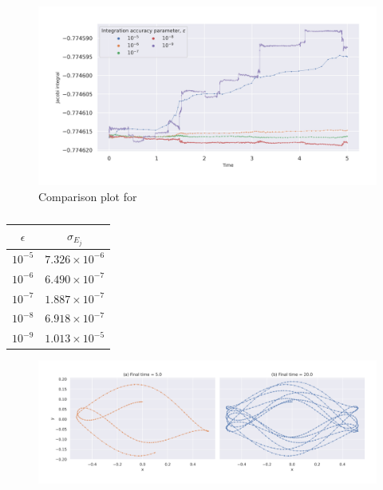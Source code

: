 \documentclass[a4paper]{article}
\begin{document}
		\begin{figure} [h]
			\includegraphics[width=\columnwidth]{../task1/q3-epsilon/plots/q3.jpg}
			\caption{Comparison plot for}
			\label{fig:task1.3}
		\end{figure}
		
		\begin{table} [h]
			\centering
			\setlength{\tabcolsep}{20pt} 
			\begin{tabular} {c c}
				\toprule
				\textbf{\(\epsilon\)} & \textbf{\(\sigma_{E_j}\)} \\
				\midrule
				\addlinespace
				\(10^{-5}\) & \(7.326 \times 10^{-6}\)
\\ 
				\(10^{-6}\) & \(6.490 \times 10^{-7}\) \\
				\(10^{-7}\) & \(1.887 \times 10^{-7}\) \\
				\(10^{-8}\) & \(6.918 \times 10^{-7}\) \\
				\(10^{-9}\) & \(1.013 \times 10^{-5}\) \\
				\bottomrule
			\end{tabular}
			\caption{}
			\label{table:task1.1}
		\end{table}
	
		\begin{figure} [h]
			\includegraphics[width=\columnwidth]{../task1/q4-trajectory/plots/q4.jpg}
			\caption{}
			\label{fig:task1.4}
		\end{figure}
	
\end{document}
